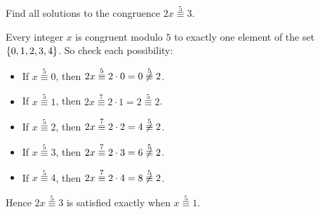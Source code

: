 \documentclass[11pt,fleqn,dvipsnames,usenames]{article}
\begin{document}
\begin{example}
Find all solutions to the congruence $2x\overset{5}{\equiv} 3$.
\end{example}

\solution Every integer $x$ is congruent modulo $5$ to exactly one element of the set $\left\{0,1,2,3,4\right\}$.  So check each possibility:
\begin{itemize}[\ ]
\item If $x\overset{5}{\equiv}0$, then $2x\overset{5}{\equiv} 2\cdot 0 = 0\not\overset{5}{\equiv}2$.
\item If $x\overset{5}{\equiv}1$, then $2x\overset{7}{\equiv}2\cdot 1 = 2\overset{5}{\equiv}2$.
\item If $x\overset{5}{\equiv}2$, then $2x\overset{7}{\equiv}2\cdot 2 = 4\not\overset{5}{\equiv}2$.
\item If $x\overset{5}{\equiv}3$, then $2x\overset{7}{\equiv}2\cdot 3 = 6\not\overset{5}{\equiv}2$.
\item If $x\overset{5}{\equiv}4$, then $2x\overset{7}{\equiv}2\cdot 4 = 8\not\overset{5}{\equiv}2$.
\end{itemize}
Hence $2x\overset{5}{\equiv} 3$ is satisfied exactly when $x\overset{5}{\equiv}1$.
\vsp
\end{document}
